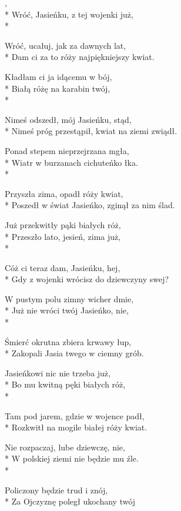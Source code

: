 \begin{lyrics}[longestline={Nimeś próg przestąpił, kwiat na ziemi zwiądł.}]

,\\*
Wróć, Jasieńku, z tej wojenki już,\\*
\begin{markverses}%
Wróć, ucałuj, jak za dawnych lat,\\*
Dam ci za to róży najpiękniejszy kwiat.
\end{markverses}

Kładłam ci ja idącemu w bój,\\*
Białą różę na karabin twój,\\*
\begin{markverses}%
Nimeś odszedł, mój Jasieńku, stąd,\\*
Nimeś próg przestąpił, kwiat na ziemi zwiądł.
\end{markverses}

Ponad stepem nieprzejrzana mgła,\\*
Wiatr w burzanach cichuteńko łka.\\*
\begin{markverses}%
Przyszła zima, opadł róży kwiat,\\*
Poszedł w świat Jasieńko, zginął za nim ślad.
\end{markverses}

Już przekwitły pąki białych róż,\\*
Przeszło lato, jesień, zima już,\\*
\begin{markverses}%
Cóż ci teraz dam, Jasieńku, hej,\\*
Gdy z wojenki wrócisz do dziewczyny swej?
\end{markverses}

W pustym polu zimny wicher dmie,\\*
Już nie wróci twój Jasieńko, nie,\\*
\begin{markverses}%
Śmierć okrutna zbiera krwawy łup,\\*
Zakopali Jasia twego w ciemny grób.
\end{markverses}

Jasieńkowi nic nie trzeba już,\\*
Bo mu kwitną pęki białych róż,\\*
\begin{markverses}%
Tam pod jarem, gdzie w wojence padł,\\*
Rozkwitł na mogile białej róży kwiat.
\end{markverses}

Nie rozpaczaj, lube dziewczę, nie,\\*
W polskiej ziemi nie będzie mu źle.\\*
\begin{markverses}%
Policzony będzie trud i znój,\\*
Za Ojczyznę poległ ukochany twój
\end{markverses}
\end{lyrics}



